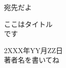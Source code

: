 \begin{titlepage}
    \begin{flushleft}
        { \Large 宛先だよ}
    \end{flushleft}

    \vspace{120pt}
    \begin{center}
        { \Huge ここはタイトル} \\
        { \Huge です}
    \end{center}

    \vspace{380pt}
    \begin{center}
        { \huge 2XXX年YY月ZZ日} \\
        { \huge  著者名を書いてね }        
    \end{center}
        
\end{titlepage}